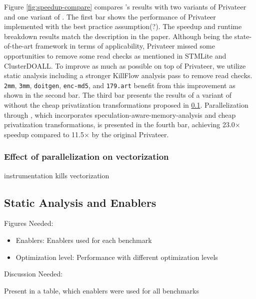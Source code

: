 Figure \ref{fig:speedup-compare} compares \namensp's results with two
variants of Privateer and one variant of \namensp. The first bar shows the
performance of Privateer implemented with the best practice assumption(?). The
speedup and runtime breakdown results match the description in the paper.
Although being the state-of-the-art framework in terms of applicability,
Privateer missed some opportunities to remove some read checks as mentioned
in STMLite\cite{mehrara:09:stmlite} and ClusterDOALL\cite{kim:12:cgo}. To
improve as much as possible on top of Privateer, we utilize static
analysis including a stronger KillFlow analysis pass to remove read checks.
\texttt{2mm}, \texttt{3mm}, \texttt{doitgen}, \texttt{enc-md5}, and
\texttt{179.art} benefit from this improvement as shown in the second bar.
The third bar presents the results of a variant of \name without the cheap
privatization transformations proposed in \ref{}. Parallelization through
\name, which incorporates speculation-aware-memory-analysis and cheap
privatization transformations, is presented in the fourth bar, achieving
23.0$\times$ speedup compared to 11.5$\times$ by the original Privateer.


\subsubsection{Effect of parallelization on vectorization}

instrumentation kills vectorization


\subsection{Static Analysis and Enablers}
Figures Needed:
\begin{itemize}

\item Enablers: Enablers used for each benchmark
\item Optimization level: Performance with different optimization levels
\end{itemize}

Discussion Needed:

Present in a table, which enablers were used for all benchmarks

